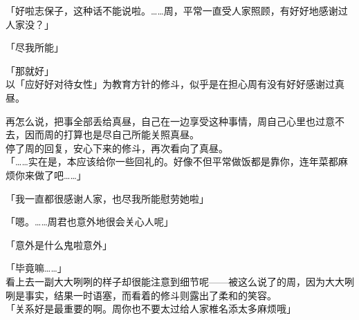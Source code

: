 「好啦志保子，这种话不能说啦。……周，平常一直受人家照顾，有好好地感谢过人家没？」

「尽我所能」

「那就好」\\

以「应好好对待女性」为教育方针的修斗，似乎是在担心周有没有好好感谢过真昼。

再怎么说，把事全部丢给真昼，自己在一边享受这种事情，周自己心里也过意不去，因而周的打算也是尽自己所能关照真昼。\\

停了周的回复，安心下来的修斗，再次看向了真昼。\\

「……实在是，本应该给你一些回礼的。好像不但平常做饭都是靠你，连年菜都麻烦你来做了吧……」

「我一直都很感谢人家，也尽我所能慰劳她啦」

「嗯。……周君也意外地很会关心人呢」

「意外是什么鬼啦意外」

「毕竟嘛……」\\

看上去一副大大咧咧的样子却很能注意到细节呢——被这么说了的周，因为大大咧咧是事实，结果一时语塞，而看着的修斗则露出了柔和的笑容。\\

「关系好是最重要的啊。周你也不要太过给人家椎名添太多麻烦哦」


